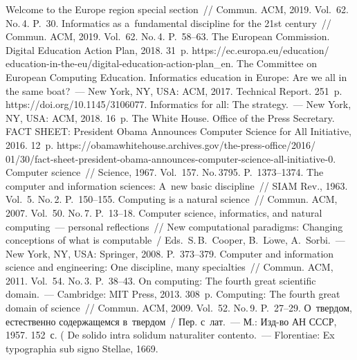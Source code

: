 \begin{multicols}{2}
{{\begin{thebibliography}{99}
 Welcome to the Europe region special section~// 
Commun. ACM, 2019. Vol.~62. No.\,4. P.~30.
 Informatics as 
a~fundamental discipline for the 21st century~// Commun. ACM, 2019. 
Vol.~62. No.\,4. P.~58--63.
The European Commission. Digital Education Action Plan, 2018. 31~p. {\sf 
https://ec.europa.eu/education/ education-in-the-eu/digital-education-action-plan\_en}.
The Committee on European Computing Education. Informatics education in Europe: 
Are we all in the same boat?~--- New York, NY, USA: ACM, 
2017.  Technical Report. 251~p. {\sf https://doi.org/10.1145/3106077}.
 Informatics for all: 
The strategy.~--- New York, NY, USA: ACM, 2018. 16~p.
The White House. Office of the Press Secretary. FACT SHEET: President Obama 
Announces Computer Science for All Initiative, 2016. 12~p. {\sf 
https://\linebreak obamawhitehouse.archives.gov/the-press-office/2016/ 01/30/fact-sheet-president-obama-announces-computer-science-all-initiative-0}.
 Computer science~// Science, 1967. Vol.~157. 
No.\,3795. P.~1373--1374.
 The computer and information sciences: A~new basic discipline~// 
SIAM Rev., 1963. Vol.~5. No.\,2. P.~150--155.
 Computing is a natural science~// Commun. ACM, 2007. 
Vol.~50. No.\,7. P.~13--18.
 Computer science, informatics, and natural computing~--- 
personal reflections~// New computational paradigms: Changing conceptions of what 
is computable~/ Eds.\ S.\,B.~Cooper, B.~L$\ddot{\mbox{o}}$we, A.~Sorbi.~--- 
New York, NY, USA: Springer, 2008. P.~373--379.
 Computer and information science and engineering: One discipline, 
many specialties~// Commun. ACM, 2011. Vol.~54. No.\,3. P.~38--43.
 On computing: The fourth great scientific domain.~--- 
Cambridge: MIT Press, 2013. 308~p.
 Computing: The fourth great domain of science~// 
Commun.  ACM, 2009. Vol.~52. No.\,9. P.~27--29.
 О~твердом, естественно содержащемся в~твердом~/
Пер. с~лат.~--- М.: Изд-во АН 
СССР, 1957. 152~с. ( De solido intra solidum naturaliter contento.~--- 
Florentiae: Ex typographia sub signo Stellae, 1669. {\sf 
}
\end{thebibliography}}}
\end{multicols}
